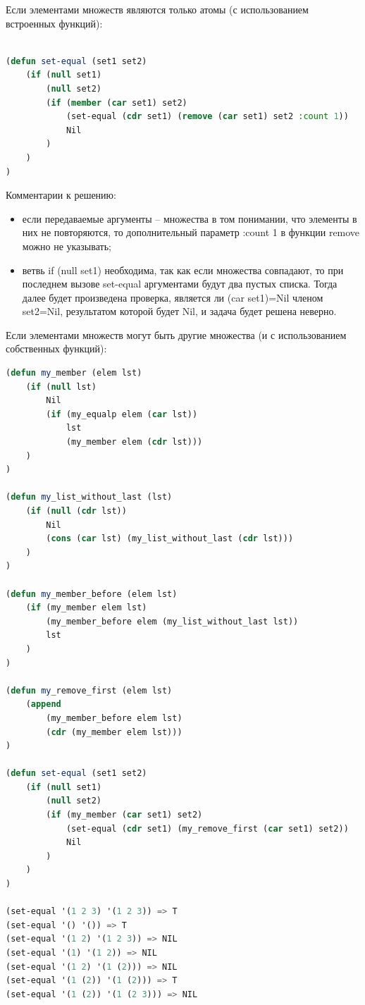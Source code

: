 \documentclass[12pt]{report}
\begin{document}
Если элементами множеств являются только атомы (с использованием встроенных функций):

\begin{lstlisting}[language=Lisp]	

(defun set-equal (set1 set2)
	(if (null set1)  
		(null set2)
		(if (member (car set1) set2) 
			(set-equal (cdr set1) (remove (car set1) set2 :count 1))
			Nil
		)
	)
)
\end{lstlisting}

Комментарии к решению:
\begin{itemize}
	\item если передаваемые аргументы -- множества в том понимании, что элементы в них не повторяются, то дополнительный параметр :count 1 в функции remove можно не указывать;
	\item ветвь if (null set1) необходима, так как если множества совпадают, то при последнем вызове set-equal аргументами будут два пустых списка. Тогда далее будет произведена проверка, является ли (car set1)=Nil членом set2=Nil, результатом которой будет Nil, и задача будет решена неверно.
\end{itemize}


Если элементами множеств могут быть другие множества (и с использованием собственных функций):

\begin{lstlisting}[language=Lisp]	
(defun my_member (elem lst)
	(if (null lst)
		Nil
		(if (my_equalp elem (car lst))
			lst
			(my_member elem (cdr lst)))
	)
)

(defun my_list_without_last (lst)
	(if (null (cdr lst))
		Nil
		(cons (car lst) (my_list_without_last (cdr lst)))
	)
)

(defun my_member_before (elem lst)
	(if (my_member elem lst)
		(my_member_before elem (my_list_without_last lst))
		lst
	)
)

(defun my_remove_first (elem lst)
	(append 
		(my_member_before elem lst) 
		(cdr (my_member elem lst)))
)

(defun set-equal (set1 set2)
	(if (null set1)  
		(null set2)
		(if (my_member (car set1) set2) 
			(set-equal (cdr set1) (my_remove_first (car set1) set2))
			Nil
		)
	)
)

(set-equal '(1 2 3) '(1 2 3)) => T
(set-equal '() '()) => T
(set-equal '(1 2) '(1 2 3)) => NIL
(set-equal '(1) '(1 2)) => NIL
(set-equal '(1 2) '(1 (2))) => NIL
(set-equal '(1 (2)) '(1 (2))) => T
(set-equal '(1 (2)) '(1 (2 3))) => NIL
\end{lstlisting}
\end{document}
